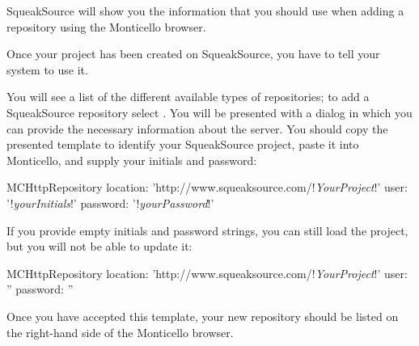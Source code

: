 \documentclass[a4paper,10pt,twoside]{book}
\begin{document}
SqueakSource will show you the information that you should use when adding a repository using the Monticello browser. 

Once your project has been created on SqueakSource, you have to tell your \squeak system to use it. 

You will see a list of the different available types of repositories; to add a SqueakSource repository select .
You will be presented with a dialog in which you can provide the necessary information about the server.
You should copy the presented template to identify your SqueakSource project, paste it into Monticello, and supply your initials and password:

\begin{code}{}
MCHttpRepository
    location: 'http://www.squeaksource.com/!\emph{YourProject}!'
    user: '!\emph{yourInitials}!'
    password: '!\emph{yourPassword}!'
\end{code}

\noindent
If you provide empty initials and password strings, you can still load the project, but you will not be able to update it:

\begin{code}{}
MCHttpRepository
    location: 'http://www.squeaksource.com/!\emph{YourProject}!'
    user: ''
    password: ''
\end{code}

Once you have accepted this template, your new repository should be listed on the right-hand side of the Monticello browser.
\end{document}
